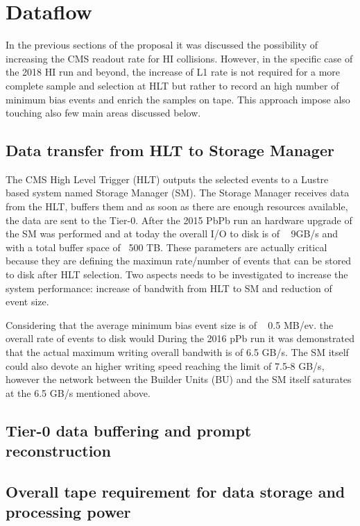 \newpage

\section{Dataflow\label{sec:dataflow}}
In the previous sections of the proposal it was discussed the possibility of increasing the CMS readout rate for HI collisions. However, in the specific case of the 2018 HI run and beyond, the increase of L1 rate is not required for a more complete sample and selection at HLT but rather to record an high number of minimum bias events and enrich the samples on tape. This approach impose also touching also few main areas discussed below.


\subsection{Data transfer from HLT to Storage Manager\label{subsec:hltSM}}
The CMS High Level Trigger (HLT) outputs the selected events to a Lustre based system named Storage Manager (SM). The Storage Manager receives data from the HLT, buffers them and as soon as there are enough resources available, the data are sent to the Tier-0.  
After the 2015 PbPb run an hardware upgrade of the SM was performed and at today the overall I/O to disk is of ~ 9GB/s and with a total buffer space of ~500 TB. These parameters are actually critical because they are defining the maximun rate/number of events that can be stored to disk after HLT selection. Two aspects needs to be investigated to increase the system performance: increase of bandwith from HLT to SM and  reduction of event size.

 
Considering that the average minimum bias event size is of ~ 0.5 MB/ev. the overall rate of events to disk would 
During the 2016 pPb run it was demonstrated that the actual maximum writing overall bandwith is of 6.5 GB/s. The SM itself could also devote an higher writing speed reaching the limit of 7.5-8 GB/s, however the network between the Builder Units (BU) and the SM itself saturates at the 6.5 GB/s mentioned above.  
\subsection{Tier-0 data buffering and prompt reconstruction\label{subsec:Tier-0}}

\subsection{Overall tape requirement for data storage and processing power\label{subsec:processing}} 
